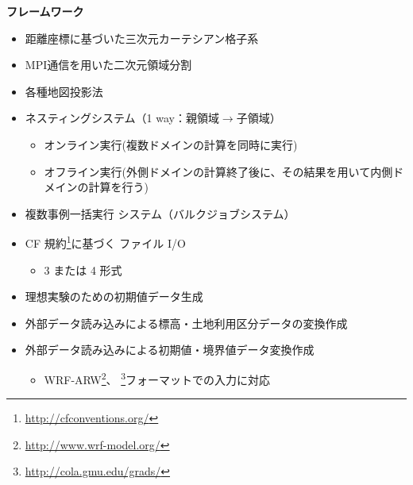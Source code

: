{\bf フレームワーク}
\begin{itemize}
 \item 距離座標に基づいた三次元カーテシアン格子系
 \item MPI通信を用いた二次元領域分割
 \item 各種地図投影法
 \item ネスティングシステム（1 way：親領域$\to$子領域）
   \begin{itemize}
    \item オンライン実行(複数ドメインの計算を同時に実行)
    \item オフライン実行(外側ドメインの計算終了後に、その結果を用いて内側ドメインの計算を行う)
   \end{itemize}
 \item 複数事例一括実行 システム（バルクジョブシステム）
 \item CF 規約\footnote{\url{http://cfconventions.org/}}に基づく \netcdf ファイル I/O
   \begin{itemize}
   \item {\netcdf}3 または {\netcdf}4 形式
   \end{itemize}
 \item 理想実験のための初期値データ生成
 \item 外部データ読み込みによる標高・土地利用区分データの変換作成
 \item 外部データ読み込みによる初期値・境界値データ変換作成
   \begin{itemize}
    \item 
      WRF-ARW\footnote{\url{http://www.wrf-model.org/}}、
      \grads \footnote{\url{http://cola.gmu.edu/grads/}}フォーマットでの入力に対応
   \end{itemize}
\end{itemize}

